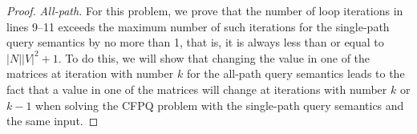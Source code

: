 \begin{proof}
\textit{All-path.} %
For this problem, we prove that the number of loop iterations in lines 9--11 exceeds the maximum number of such iterations for the single-path query semantics by no more than 1, that is, it is always less than or equal to $|N||V|^2 + 1$. To do this, we will show that changing the value in one of the matrices at iteration with number $k$ for the all-path query semantics leads to the fact that a value in one of the matrices will change at iterations with number $k$ or $k - 1$ when solving the CFPQ problem with the single-path query semantics and the same input.


\end{proof}
